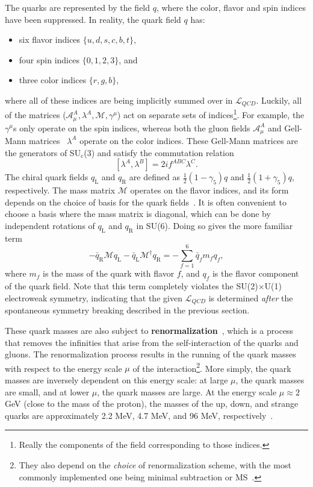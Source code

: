 The quarks are represented by the field $q$, where the color, flavor and spin indices have been suppressed. In reality, the quark field $q$ has:
%
\begin{itemize}
    \item six flavor indices $\{u, d, s, c, b, t\}$,
    \item four spin indices $\{0, 1, 2, 3\}$, and
    \item three color indices $\{r, g, b\}$,
\end{itemize}
%
where all of these indices are being implicitly summed over in $\mathcal{L}_{QCD}$. Luckily, all of the matrices ($\mathcal{A}_\mu^A, \lambda^A, \mathcal{M}, \gamma^\mu$) act on separate sets of indices\footnote{Really the components of the field corresponding to those indices.}. For example, the $\gamma^\mu$s only operate on the spin indices, whereas both the gluon fields $\mathcal{A}_\mu^A$ and Gell-Mann matrices~\cite{GellMannEightfold} $\lambda^A$ operate on the color indices. These Gell-Mann matrices are the generators of SU$_\text{c}$(3) and satisfy the commutation relation
%
\begin{equation}
    \label{eq:gell_mann_commutation}
    [\lambda^A, \lambda^B] = 2if^{ABC}\lambda^C.
\end{equation}
%
The chiral quark fields $q_\text{L}$ and $q_\text{R}$ are defined as $\frac{1}{2}(1 - \gamma_5)q$ and $\frac{1}{2}(1 + \gamma_5)q$, respectively. The mass matrix $\mathcal{M}$ operates on the flavor indices, and its form depends on the choice of basis for the quark fields~\cite{QCDHistory}. It is often convenient to choose a basis where the mass matrix is diagonal, which can be done by independent rotations of $q_\text{L}$ and $q_\text{R}$ in SU(6). Doing so gives the more familiar term
%
\begin{equation}
    -\bar{q}_{\mathrm{R}} \mathcal{M} q_{\mathrm{L}}-\bar{q}_{\mathrm{L}} \mathcal{M}^{\dagger} q_{\mathrm{R}} = -\sum_{f = 1}^{6}\bar{q}_f m_f q_f,
    \label{eq:mass_matrix}
\end{equation}
where $m_f$ is the mass of the quark with flavor $f$, and $q_f$ is the flavor component of the quark field. Note that this term completely violates the SU(2)$\times$U(1) electroweak symmetry, indicating that the given $\mathcal{L}_{QCD}$ is determined \textit{after} the spontaneous symmetry breaking described in the previous section. 

These quark masses are also subject to \textbf{renormalization}~\cite{MassRenorm}, which is a process that removes the infinities that arise from the self-interaction of the quarks and gluons. The renormalization process results in the running of the quark masses with respect to the energy scale $\mu$ of the interaction\footnote{They also depend on the \textit{choice} of renormalization scheme, with the most commonly implemented one being minimal subtraction or MS~\cite{MSScheme}.}. More simply, the quark masses are inversely dependent on this energy scale: at large $\mu$, the quark masses are small, and at lower $\mu$, the quark masses are large. At the energy scale $\mu \approx 2$ GeV (close to the mass of the proton), the masses of the up, down, and strange quarks are approximately 2.2 MeV, 4.7 MeV, and 96 MeV, respectively~\cite{PDG}. 

